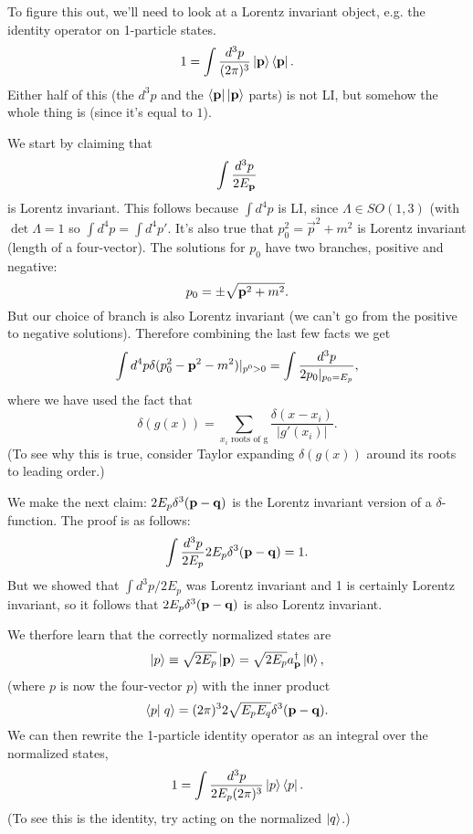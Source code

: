 To figure this out, we'll need to look at a Lorentz invariant object, e.g. the identity operator on 1-particle states.
$$1=\int \frac{d^3p}{(2\pi)^3} \left| \boldsymbol{\mathbf{p}} \right>\left< \boldsymbol{\mathbf{p}} \right|.$$
Either half of this (the $d^3p$ and the $\left< \boldsymbol{\mathbf{p}} \right|\left| \boldsymbol{\mathbf{p}} \right>$ parts) is not LI, but somehow the whole thing is (since it's equal to $1$).

We start by claiming that
$$\int \frac{d^3p}{2E_{\boldsymbol{\mathbf{p}}}}$$ is Lorentz invariant. This follows because $\int d^4p$ is LI, since $\Lambda \in SO(1,3)$ (with $\det \Lambda=1$ so $\int d^4p = \int d^4 p'$. It's also true that $p_0^2= \vec{p}^2+m^2$ is Lorentz invariant (length of a four-vector). The solutions for $p_0$ have two branches, positive and negative:
$$p_0 = \pm \sqrt{\boldsymbol{\mathbf{p}}^2+m^2}.$$
But our choice of branch is also Lorentz invariant (we can't go from the positive to negative solutions). Therefore combining the last few facts we get
$$\int d^4 p \delta(p_0^2-\boldsymbol{\mathbf{p}}^2-m^2)|_{p^0 >0} = \int \frac{d^3 p}{2p_0|_{p_0=E_p}},$$
where we have used the fact that $$\delta(g(x))=\sum_{x_i\text{ roots of g}} \frac{\delta(x-x_i)}{|g'(x_i)|}.$$
(To see why this is true, consider Taylor expanding $\delta(g(x))$ around its roots to leading order.)

We make the next claim: $2E_p \delta^3(\boldsymbol{\mathbf{p}} - \boldsymbol{\mathbf{q}})$ is the Lorentz invariant version of a $\delta$-function. The proof is as follows:
$$\int \frac{d^3 p}{2E_p} 2E_p \delta^3(\boldsymbol{\mathbf{p}} - \boldsymbol{\mathbf{q}})=1.$$
But we showed that $\int d^3p/2E_p$ was Lorentz invariant and 1 is certainly Lorentz invariant, so it follows that $2E_p\delta^3(\boldsymbol{\mathbf{p}}-\boldsymbol{\mathbf{q}})$ is also Lorentz invariant.

We therfore learn that the correctly normalized states are
$$\left| p \right>\equiv \sqrt{2E_p}\left| \boldsymbol{\mathbf{p}} \right> = \sqrt{2 E_p}a_{\boldsymbol{\mathbf{p}}}^\dagger \left| 0 \right>,$$
(where $p$ is now the four-vector $p$) with the inner product
$$\braket{p}{q}=(2\pi)^3 2\sqrt{E_p E_q} \delta^3(\pv - \vec q).$$
We can then rewrite the 1-particle identity operator as an integral over the normalized states,
$$1=\int \frac{d^3p}{2E_p(2\pi)^3} \left| p \right>\left< p \right|.$$
(To see this is the identity, try acting on the normalized $\left| q \right>$.)

